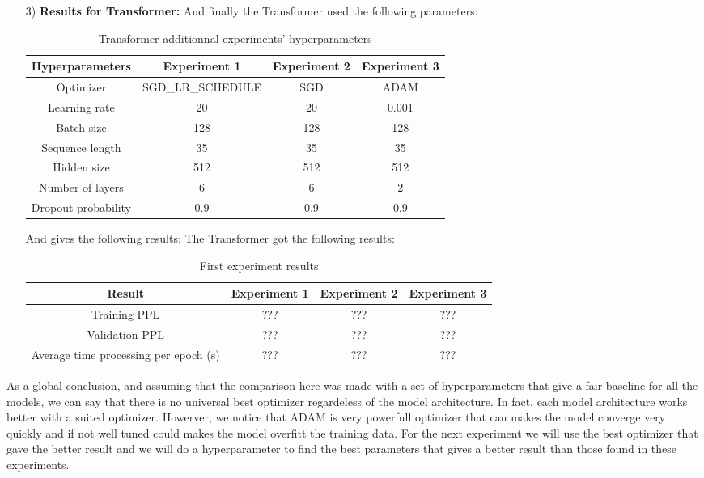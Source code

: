 \begin{itemize}
		\item[3)] \textbf{Results for Transformer:}
		And finally the Transformer used the following parameters:
		\begin{table}[H]
			\centering
			\begin{tabular}{||c c c c||} 
				\hline
				\textbf{Hyperparameters} &\textbf{Experiment 1} & \textbf{Experiment 2} & \textbf{Experiment 3}\\[0.5ex] 
				\hline
				Optimizer & SGD\_LR\_SCHEDULE & SGD & ADAM\\
				Learning rate & 20 & 20 & 0.001  \\
				Batch size & 128 & 128 & 128 \\
				Sequence length & 35 & 35 & 35\\
				Hidden size & 512 & 512 & 512 \\
				Number of layers & 6 & 6 & 2 \\
				Dropout probability & 0.9 & 0.9 &0.9 \\[1ex]
				\hline
			\end{tabular}
			\caption{Transformer additionnal experiments' hyperparameters}
			\label{table:5}
		\end{table}
And gives the following results:
%
The Transformer got the following results:
\begin{table}[H]
	\centering
	\begin{tabular}{||c c c c||} 
		\hline
		\textbf{Result} & \textbf{Experiment 1} & \textbf{Experiment 2}& \textbf{Experiment 3} \\[0.5ex] 
		\hline
		Training PPL & ??? & ??? & ???  \\
		Validation PPL & ???  & ???  & ???  \\
		Average time processing per epoch (s) & ???  & ???  & ???  \\[1ex]
		\hline
	\end{tabular}
	\caption{First experiment results}
	\label{table:5.1}
\end{table}
\end{itemize}
%
As a global conclusion, and assuming that the comparison here was made with a set of hyperparameters that give a fair baseline for all the models, we can say that there is no universal best optimizer regardeless of the model architecture. In fact, each model architecture works better with a suited optimizer. Howerver, we notice that ADAM is very powerfull optimizer that can makes the model converge very quickly and if not well tuned could makes the model overfitt the training data. For the next experiment we will use the best optimizer that gave the better result and we will do a hyperparameter to find the best parameters that gives a better result than those found in these experiments.



